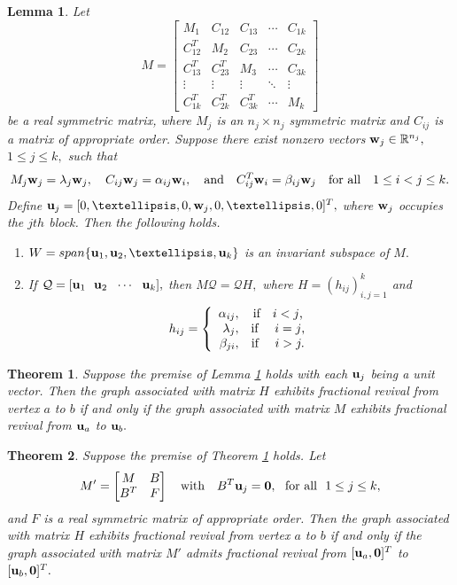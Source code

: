 \documentclass[10pt,a4paper]{amsart}
\newtheorem{lem}{Lemma}
\newtheorem{thm}{Theorem}
\def \u {{\bf u}}
\def \w {{\bf w}}
\begin{document}
\begin{lem}\label{6l1}
    Let \[M=\begin{bmatrix}
        M_1 & C_{12} & C_{13} &\cdots & C_{1k}\\
        C_{12}^T & M_2 & C_{23} &\cdots & C_{2k}\\ 
        C_{13}^T & C_{23}^T & M_3  &\cdots & C_{3k}\\
        \vdots & \vdots & \vdots & \ddots & \vdots\\
         C_{1k}^T & C_{2k}^T & C_{3k}^T & \cdots & M_k
        \end{bmatrix}\] be a real symmetric matrix, where $M_j$ is an $n_j\times n_j$ symmetric matrix and $C_{ij}$ is a matrix of appropriate order. Suppose there exist nonzero vectors $\w_j\in\mathbb{R}^{n_j},$ $1\leq j\leq k,$ such that 
        \[M_j\w_j=\lambda_j\w_j, \quad   C_{ij}\w_j=\alpha_{ij}\w_i, \quad \text{and}\quad C_{ij}^T\w_i=\beta_{ij}\w_j  \quad \text{for all}\quad 1\leq i< j\leq k.    \]
        Define $\u_j=[0,\ldots,0,\w_j,0,\ldots,0]^T,$ where $\w_j$ occupies the $jth$ block.
        Then the following holds.
        \begin{enumerate}
            \item $W=span\{\u_1,\u_2,\ldots,\u_k\}$ is an invariant subspace of $M.$ 
            \item If $\mathcal{Q}=[\u_1~~ \u_2~~ \cdots~~ \u_k],$ then $M\mathcal{Q}=\mathcal{Q}H,$ where $H=(h_{ij})_{i,j=1}^k$ and  \[h_{ij}=\left\{ \begin{array}{rcl}
            
 \alpha_{ij}, & \text{if\quad $i<j$,} \\
 \lambda_j, & \text{if \quad$i=j$,}\\

 \beta_{ji}, & \text{if \quad $i>j.$}
 \end{array}\right.\]
        \end{enumerate}
\end{lem}

\begin{thm}\label{6t1}
    Suppose the premise of Lemma \ref{6l1} holds with each $\u_j$ being a unit vector. Then the graph associated with matrix $H$ exhibits fractional revival from vertex $a$ to $b$ if and only if the graph associated with matrix $M$ exhibits fractional revival from $\u_a$ to $\u_b.$ 
\end{thm}

\begin{thm}\label{6t4}
    Suppose the premise of Theorem \ref{6t1} holds. Let 
    \[M'=\begin{bmatrix}
        M & B\\
        B^T & F
    \end{bmatrix}\quad\text{with} \quad B^T\u_j=\mathbf{0}, ~~\text{for all}~~1\leq j \leq k,\]
    and $F$ is a real symmetric matrix of appropriate order.
    Then the graph associated with matrix $H$ exhibits fractional revival from vertex $a$ to $b$ if and only if  the graph associated with matrix $M'$ admits fractional revival from $[\u_a,\mathbf{0}]^T$ to $[\u_b,\mathbf{0}]^T.$
\end{thm}
\end{document}
